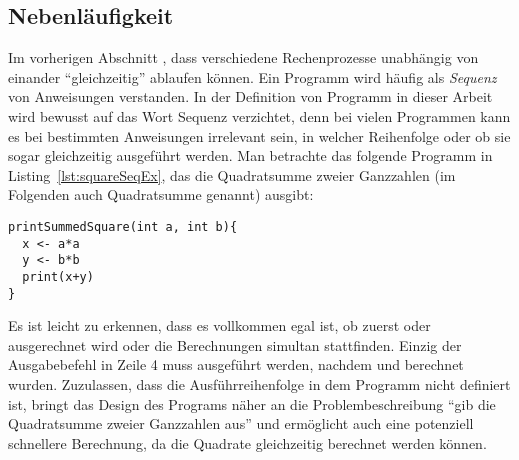 \documentclass[12pt,a4paper,listof=totocnumbered,parskip=half]{scrreprt}
\begin{document}
\subsection{Nebenläufigkeit}\label{sec:nebenl}
Im vorherigen Abschnitt , dass verschiedene Rechenprozesse unabhängig von einander \enquote{gleichzeitig} ablaufen können. Ein Programm wird häufig als \emph{Sequenz} von Anweisungen verstanden. In der Definition von Programm in dieser Arbeit wird bewusst auf das Wort Sequenz verzichtet, denn bei vielen Programmen kann es bei bestimmten Anweisungen irrelevant sein, in welcher Reihenfolge oder ob sie sogar gleichzeitig ausgeführt werden. Man betrachte das folgende Programm in Listing~\ref{lst:squareSeqEx}, das die Quadratsumme zweier Ganzzahlen (im Folgenden auch Quadratsumme genannt) ausgibt: 
\begin{lstlisting}[caption={Beispiel eines Programms das die Summe von Quadraten zweier Ganzzahlen berechnet. Die Berechnung der Quadratzahlen wird nacheinander in einer fest definierten Sequenz durchgeführt.}, label={lst:squareSeqEx}]
printSummedSquare(int a, int b){
  x <- a*a
  y <- b*b
  print(x+y)
}
\end{lstlisting}
Es ist leicht zu erkennen, dass es vollkommen egal ist, ob zuerst  oder  ausgerechnet wird oder die Berechnungen simultan stattfinden. Einzig der Ausgabebefehl in Zeile 4 muss ausgeführt werden, nachdem  und  berechnet wurden. Zuzulassen, dass die Ausführreihenfolge in dem Programm nicht definiert ist, bringt das Design des Programs näher an die Problembeschreibung \enquote{gib die Quadratsumme zweier Ganzzahlen aus} und ermöglicht auch eine potenziell schnellere Berechnung, da die Quadrate gleichzeitig berechnet werden können.
\end{document}
